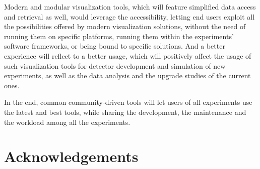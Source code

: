\documentclass[12pt,a4paper]{article}
\begin{document}
Modern and modular visualization tools, which will feature simplified data access and retrieval as well, would leverage
the accessibility, letting end users exploit all the possibilities offered by modern visualization solutions, without the need
of running them on specific platforms, running them within the experiments’ software frameworks, or being bound to specific solutions.
And a better experience will reflect to a better usage, which will positively affect the usage of such visualization tools for
detector development and simulation of new experiments, as well as the data analysis and the upgrade studies of the current ones.

In the end, common community-driven tools will let users of all experiments use the latest and best tools, while sharing the development,
the maintenance and the workload among all the experiments.

\hypertarget{acknowledgements}{%
\section{Acknowledgements}\label{acknowledgements}}
\end{document}
